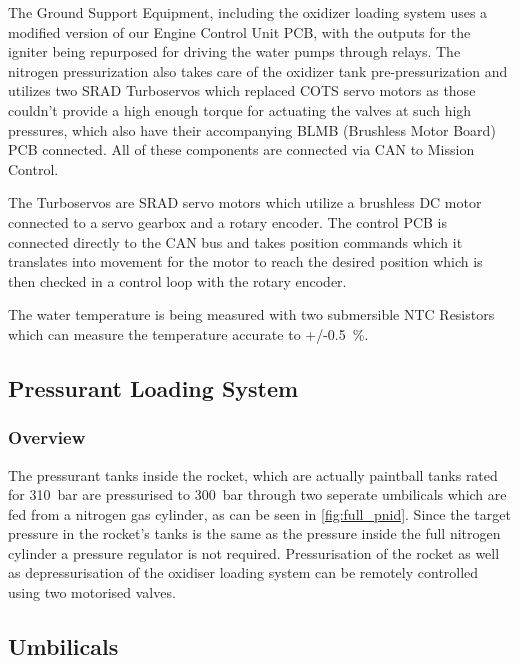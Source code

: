The Ground Support Equipment, including the oxidizer loading system uses a modified version of our Engine Control Unit PCB, with the outputs for the igniter being repurposed for driving the water pumps through relays. The nitrogen pressurization also takes care of the oxidizer tank pre-pressurization and utilizes two SRAD Turboservos which replaced COTS servo motors as those couldn't provide a high enough torque for actuating the valves at such high pressures, which also have their accompanying BLMB (Brushless Motor Board) PCB connected. All of these components are connected via CAN to Mission Control.

The Turboservos are SRAD servo motors which utilize a brushless DC motor connected to a servo gearbox and a rotary encoder. The control PCB is connected directly to the CAN bus and takes position commands which it translates into movement for the motor to reach the desired position which is then checked in a control loop with the rotary encoder.

The water temperature is being measured with two submersible NTC Resistors which can measure the temperature accurate to +/-\SI{0.5}{\percent}.


\subsection{Pressurant Loading System} %

\subsubsection{Overview}
The pressurant tanks inside the rocket, which are actually paintball tanks rated for \SI{310}{\bar} are pressurised to \SI{300}{\bar} through two seperate umbilicals which are fed from a nitrogen gas cylinder, as can be seen in \cref{fig:full_pnid}. Since the target pressure in the rocket's tanks is the same as the pressure inside the full nitrogen cylinder a pressure regulator is not required. Pressurisation of the rocket as well as depressurisation of the oxidiser loading system can be remotely controlled using two motorised valves.

\subsection{Umbilicals} %
\label{sec:umbilicals}

